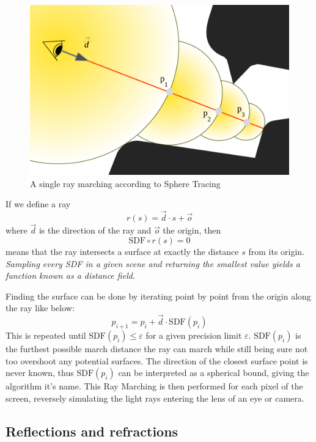 		\vspace{40pt}
		\begin{figure}
			\begin{flushright}
				\includegraphics[width=0.9\linewidth]{figure/SDF2} 
			\end{flushright}
			\caption{A single ray marching according to Sphere Tracing}
			\vspace{40pt}
		\end{figure}

		If we define a ray $$r(s) = \vec{d} \cdot s + \vec{o}$$
		where $\vec{d}$ is the direction of the ray and $\vec{o}$ the origin, then
		$$\text{SDF}\circ r(s) = 0$$ means that the ray intersects a surface at
		exactly the distance $s$ from its origin. \emph{Sampling every SDF in a
		given scene and returning the smallest value yields a function known as a
		distance field.}

		\bigskip \noindent Finding the surface can be done by iterating point by
		point from the origin along the ray like below: $$p_{i+1} = p_i +
		\vec{d}\cdot \text{SDF}(p_i)$$ This is repeated until $\text{SDF}(p_i) \leq
		\varepsilon$ for a given precision limit $\varepsilon$. $\text{SDF}(p_i)$
		is the furthest possible march distance the ray can march while still being
		sure not too overshoot any potential surfaces. The direction of the closest
		surface point is never known, thus $\text{SDF}(p_i)$ can be interpreted as
		a spherical bound, giving the algorithm it's name. This Ray Marching is
		then performed for each pixel of the screen, reversely simulating the light
		rays entering the lens of an eye or camera.

			\subsection{Reflections and refractions}

